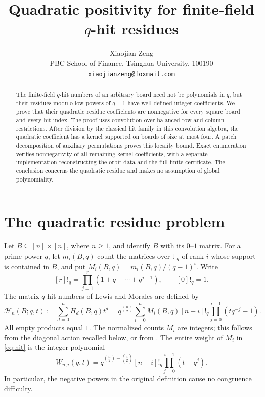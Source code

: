 \documentclass[11pt]{article}
\title{Quadratic positivity for finite-field $q$-hit residues}
\author{Xiaojian Zeng\\
  \small PBC School of Finance, Tsinghua University, 100190\\
  \small\texttt{xiaojianzeng@foxmail.com}}
\date{}
\newcommand{\FF}{\mathbb F}
\newcommand{\hit}{\mathcal H}
\begin{document}
\maketitle
\begin{abstract}
The finite-field $q$-hit numbers of an arbitrary board need not be
polynomials in $q$, but their residues modulo low powers of $q-1$ have
well-defined integer coefficients. We prove that their quadratic residue
coefficients are nonnegative for every square board and every hit index.
The proof uses convolution over balanced row and column restrictions.
After division by the classical hit family in this convolution algebra,
the quadratic coefficient has a kernel supported on boards of size at most
four. A patch decomposition of auxiliary permutations proves this
locality bound. Exact enumeration verifies nonnegativity of all remaining
kernel coefficients, with a separate implementation reconstructing the
orbit data and the full finite certificate. The conclusion concerns the
quadratic residue and makes no assumption of global polynomiality.
\end{abstract}

\section{The quadratic residue problem}

Let $B\subseteq[n]\times[n]$, where $n\geq1$, and identify $B$ with its
$0$--$1$ matrix. For a prime power $q$, let $m_i(B,q)$ count the matrices
over $\FF_q$ of rank $i$ whose support is contained in $B$, and put
$M_i(B,q)=m_i(B,q)/(q-1)^i$. Write
\[
 [r]!_q=\prod_{j=1}^{r}(1+q+\cdots+q^{j-1}),\qquad [0]!_q=1.
\]
The matrix $q$-hit numbers of Lewis and Morales
\cite[Eq.~(1.3)]{LewisMorales2020} are defined by
\begin{equation}\label{eq:hit}
 \hit_n(B;q,t):=\sum_{d=0}^{n}H_d(B,q)t^d
 =q^{\binom n2}\sum_{i=0}^{n}M_i(B,q)[n-i]!_q
       \prod_{j=0}^{i-1}(tq^{-j}-1).
\end{equation}
All empty products equal $1$. The normalized counts $M_i$ are integers;
this follows from the diagonal action recalled below, or from
\cite[Proposition~5.1]{LewisEtAl2011}. The entire weight of $M_i$ in
\eqref{eq:hit} is the integer polynomial
\begin{equation}\label{eq:integralweight}
 W_{n,i}(q,t)=q^{\binom n2-\binom i2}[n-i]!_q
                         \prod_{j=0}^{i-1}(t-q^j).
\end{equation}
In particular, the negative powers in the original definition cause no
congruence difficulty.
\end{document}
